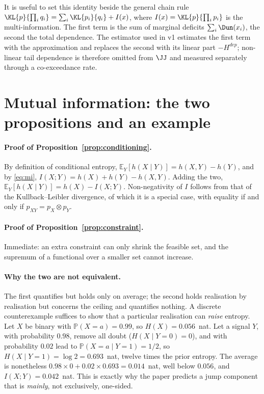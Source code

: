 It is useful to set this identity beside the general chain rule
$\KL{p}{\prod_i q_i}=\sum_i\KL{p_i}{q_i}+I(x)$, where
$I(x)=\KL{p}{\prod_i p_i}$ is the multi-information. The first term is the sum of
marginal deficits $\sum_i\Dun(x_i)$, the second the total dependence. The
estimator used in v1 estimates the first term with the \citet{hyvarinen1998}
approximation and replaces the second with its linear part $-H^{dep}$;
non-linear tail dependence is therefore omitted from $\JJ$ and measured
separately through a co-exceedance rate.

\section{Mutual information: the two propositions and an example}
\label{app:mi}

\paragraph{Proof of Proposition~\ref{prop:conditioning}.} By definition of
conditional entropy, $\mathbb{E}_Y[h(X\mid Y)]=h(X,Y)-h(Y)$, and by
\eqref{eq:mi}, $I(X;Y)=h(X)+h(Y)-h(X,Y)$. Adding the two,
$\mathbb{E}_Y[h(X\mid Y)]=h(X)-I(X;Y)$. Non-negativity of $I$ follows from that of
the Kullback--Leibler divergence, of which it is a special case, with equality if
and only if $p_{XY}=p_X\otimes p_Y$.

\paragraph{Proof of Proposition~\ref{prop:constraint}.} Immediate: an extra
constraint can only shrink the feasible set, and the supremum of a functional
over a smaller set cannot increase.

\paragraph{Why the two are not equivalent.} The first quantifies but holds only
on average; the second holds realisation by realisation but concerns the ceiling
and quantifies nothing. A discrete counterexample suffices to show that a
particular realisation can \emph{raise} entropy. Let $X$ be binary with
$\mathbb{P}(X=a)=0.99$, so $H(X)=0.056$~nat. Let a signal $Y$, with probability
$0.98$, remove all doubt ($H(X\mid Y=0)=0$), and with probability $0.02$ lead to
$\mathbb{P}(X=a\mid Y=1)=1/2$, so $H(X\mid Y=1)=\log 2=0.693$~nat, twelve times the
prior entropy. The average is nonetheless
$0.98\times0+0.02\times0.693=0.014$~nat, well below $0.056$, and
$I(X;Y)=0.042$~nat. This is exactly why the paper predicts a jump component that
is \emph{mainly}, not exclusively, one-sided.

